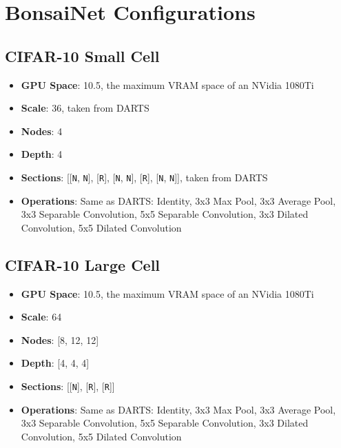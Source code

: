
\graphicspath{{Chapters/appendix\_bonsai\_configurations/figures/}}
\chapter{BonsaiNet Configurations} \label{chapter:bonsai_configs}
\section{CIFAR-10 Small Cell} \label{sect:small_cell}
\begin{itemize}   \setlength\itemsep{-.2em}
	\item \textbf{GPU Space}: 10.5, the maximum VRAM space of an NVidia 1080Ti
	\item \textbf{Scale}: 36, taken from DARTS
	\item \textbf{Nodes}: 4
	\item \textbf{Depth}: 4
	\item \textbf{Sections}: [[\texttt{N}, \texttt{N}], [\texttt{R}], [\texttt{N}, \texttt{N}], [\texttt{R}], [\texttt{N}, \texttt{N}]], taken from DARTS
	\item \textbf{Operations}: Same as DARTS: Identity, 3x3 Max Pool, 3x3 Average Pool, 3x3 Separable Convolution, 5x5 Separable Convolution,
	3x3 Dilated Convolution, 5x5 Dilated Convolution
\end{itemize}

\section{CIFAR-10 Large Cell} \label{sect:large_cell}
\begin{itemize}   \setlength\itemsep{-.2em}
	\item \textbf{GPU Space}: 10.5, the maximum VRAM space of an NVidia 1080Ti
	\item \textbf{Scale}: 64
	\item \textbf{Nodes}: [8, 12, 12]
	\item \textbf{Depth}: [4, 4, 4]
	\item \textbf{Sections}: [[\texttt{N}], [\texttt{R}], [\texttt{R}]]
	\item \textbf{Operations}: Same as DARTS: Identity, 3x3 Max Pool, 3x3 Average Pool, 3x3 Separable Convolution, 5x5 Separable Convolution,
	3x3 Dilated Convolution, 5x5 Dilated Convolution
\end{itemize}

